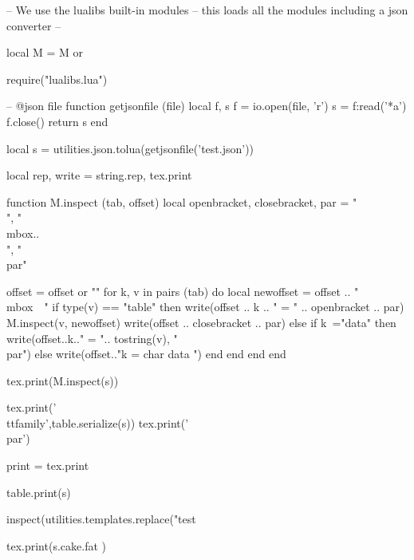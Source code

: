 \documentclass{scrbook}
\begin{document}
 
\pan
\begin{luacode}
--  We use the lualibs built-in modules
--  this loads all the modules including a json converter
--

local M = M or {}

require("lualibs.lua")


-- @json file
function getjsonfile (file)
    local f, s
	  f = io.open(file, 'r')
        s = f:read('*a')
        f.close()
        return s
 end

local s =  utilities.json.tolua(getjsonfile('test.json'))


local rep, write = string.rep, tex.print

function M.inspect (tab, offset)
   local openbracket, closebracket, par = "\\{", "\\mbox{..}\\}", "\\par"
   
    offset = offset or ""
    for k, v in pairs (tab) do
        local newoffset = offset .. "\\mbox{~~}"
        if type(v) == "table" then
           write(offset .. k .. " = " .. openbracket .. par)
           M.inspect(v, newoffset)
           write(offset .. closebracket .. par)
        else
         if k~="data" then write(offset..k.." =  ".. tostring(v), "\\par") 
           else
                 write(offset.."k = char data ")
           end
       end
    end
end

tex.print(M.inspect(s))

tex.print('\\ttfamily',table.serialize(s))
tex.print('\\par')

print = tex.print


table.print(s)

 inspect(utilities.templates.replace("test %

tex.print(s.cake.fat  )
 \end{luacode} 
 
 
 
\end{document}
